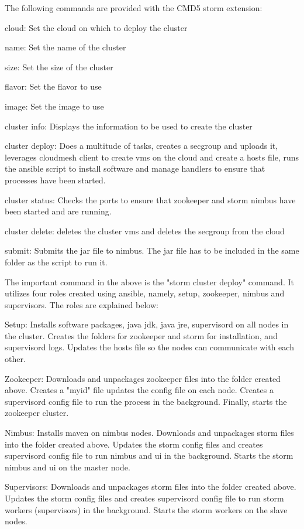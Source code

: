 \documentclass[9pt,twocolumn,twoside]{../../styles/osajnl}
\begin{document}
The following commands are provided with the CMD5 storm extension:
\begin{description}
\item cloud: Set the cloud on which to deploy the cluster
\item name: Set the name of the cluster
\item size: Set the size of the cluster
\item flavor: Set the flavor to use
\item image: Set the image to use
\item cluster info: Displays the information to be used to create the cluster
\item cluster deploy: Does a multitude of tasks, creates a secgroup
  and uploads it, leverages cloudmesh client to create vms on the
  cloud and create a hosts file, runs the ansible script to install
  software and manage handlers to ensure that processes have been
  started.
\item cluster status: Checks the ports to ensure that zookeeper and
  storm nimbus have been started and are running.
\item cluster delete: deletes the cluster vms and deletes the secgroup
  from the cloud
\item submit: Submits the jar file to nimbus. The jar file has to be
  included in the same folder as the script to run it.
\end{description}

The important command in the above is the "storm cluster deploy"
command. It utilizes four roles created using ansible, namely, setup,
zookeeper, nimbus and supervisors. The roles are explained below:
\begin{description}
\item Setup: Installs software packages, java jdk, java jre,
  supervisord on all nodes in the cluster. Creates the folders for
  zookeeper and storm for installation, and supervisord logs. Updates
  the hosts file so the nodes can communicate with each other.
\item Zookeeper: Downloads and unpackages zookeeper files into the
  folder created above. Creates a "myid" file updates the config file
  on each node. Creates a supervisord config file to run the process
  in the background. Finally, starts the zookeeper cluster.
\item Nimbus: Installs maven on nimbus nodes. Downloads and unpackages
  storm files into the folder created above. Updates the storm config
  files and creates supervisord config file to run nimbus and ui in
  the background. Starts the storm nimbus and ui on the master node.
\item Supervisors: Downloads and unpackages storm files into the
  folder created above. Updates the storm config files and creates
  supervisord config file to run storm workers (supervisors) in the
  background. Starts the storm workers on the slave nodes.
\end{description}
\end{document}
